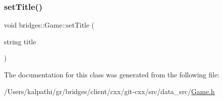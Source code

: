 \hypertarget{classbridges_1_1_game_a6cfbd26183eb1202ea29b9f005dfb76b}{}\label{classbridges_1_1_game_a6cfbd26183eb1202ea29b9f005dfb76b} 
\subsubsection{\texorpdfstring{set\+Title()}{setTitle()}}
{\footnotesize\ttfamily void bridges\+::\+Game\+::set\+Title (\begin{DoxyParamCaption}\item[{string}]{title }\end{DoxyParamCaption})\hspace{0.3cm}{\ttfamily [inline]}}



The documentation for this class was generated from the following file\+:\begin{DoxyCompactItemize}
\item 
/\+Users/kalpathi/gr/bridges/client/cxx/git-\/cxx/src/data\+\_\+src/\hyperlink{_game_8h}{Game.\+h}\end{DoxyCompactItemize}
